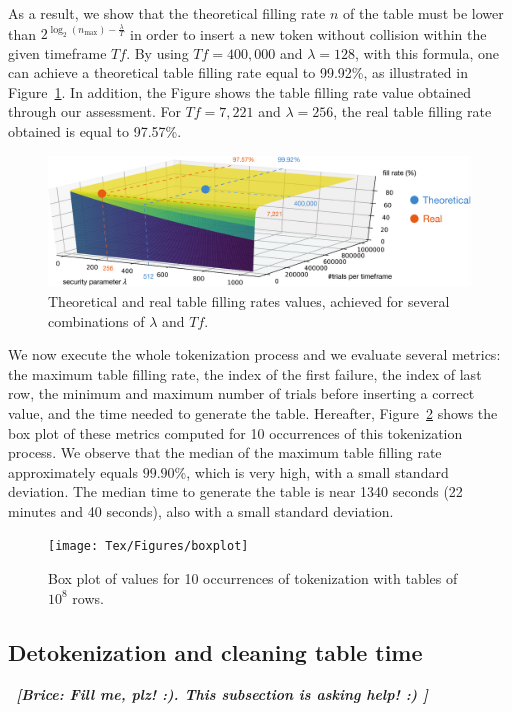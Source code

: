 \documentclass{llncs}
\newcommand{\br}[1]{\emph{\bf \color{green}~[Brice: #1]}}
\begin{document}
As a result, we show that the theoretical filling rate $n$ of the table must be lower than $2^{\log_2(n_{\max})-\frac{\lambda}{T}}$ in order to insert a new token without collision within the given timeframe $Tf$. By using $Tf = 400,000$ and $\lambda=128$, with this formula, one can achieve a theoretical table filling rate equal to 99.92\%, as illustrated in Figure~\ref{fig:3d-plot}. In addition, the Figure shows the table filling rate value obtained through our assessment. For $Tf=7,221$ and $\lambda=256$, the real table filling rate obtained is equal to 97.57\%.

\begin{figure}
    \centering
    \includegraphics[width=\textwidth]{Tex/Figures/3d_plot}
    \caption{Theoretical and real table filling rates values, achieved for several combinations of $\lambda$ and $Tf$.}
    \label{fig:3d-plot}
\end{figure}

We now execute the whole tokenization process and we evaluate several metrics: the maximum table filling rate, the index of the first failure, the index of last row, the minimum and maximum number of trials before inserting a correct value, and the time needed to generate the table.
Hereafter, Figure~\ref{fig:boxplot} shows the box plot of these metrics computed for 10 occurrences of this tokenization process. We observe that the median of the maximum table filling rate approximately equals $99.90\%$, which is very high, with a small standard deviation. The median time to generate the table is near 1340 seconds (22 minutes and 40 seconds), also with a small standard deviation.

\begin{figure}
    \centering
    \texttt{[image: Tex/Figures/boxplot]}
    \caption{Box plot of values for 10 occurrences of tokenization with tables of $10^8$ rows.}
    \label{fig:boxplot}
\end{figure}

\subsection{Detokenization and cleaning table time}
\br{Fill me, plz! :). This subsection is asking help! :) }
\end{document}
